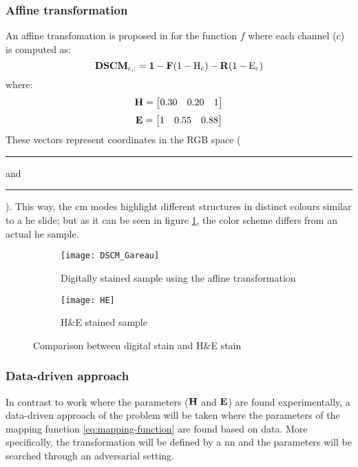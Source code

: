 \documentclass[../main.tex]{subfiles}
\begin{document}
\subsubsection{Affine transformation}
\label{sec:affine-transformation}
An affine transfomation is proposed in \cite{Gareau2009} for the function $f$
where each channel ($c$) is computed as:
\begin{equation} \label{eq:affine-transformation}
	\mathbf{DSCM}_{c,:} = \mathbf{1}
	- \mathbf{F} (1 - \text{H}_c) - \mathbf{R} (1 - \text{E}_c)
\end{equation}
where:
$$ \mathbf{H} = \begin{bmatrix} 0.30 & 0.20 & 1 \end{bmatrix} $$
$$ \mathbf{E} = \begin{bmatrix} 1 & 0.55 & 0.88 \end{bmatrix} $$
These vectors represent coordinates in the RGB space (
\textcolor{Hcolor}{\rule{0.7\baselineskip}{0.7\baselineskip}} and
\textcolor{Ecolor}{\rule{0.7\baselineskip}{0.7\baselineskip}}).
This way, the \gls{cm} modes highlight different structures in distinct
colours similar to a \gls{he} slide; but as it can be seen in figure \ref{fig:affine-example},
the color scheme differs from an actual \gls{he} sample.

\begin{figure}[h]
\centering
\begin{subfigure}{.5\textwidth}
  \centering
  \texttt{[image: DSCM\_Gareau]}
  \caption{Digitally stained sample using the affine transformation}
\end{subfigure}%
\begin{subfigure}{.5\textwidth}
  \centering
  \texttt{[image: HE]}
  \caption{H\&E stained sample}
\end{subfigure}
\caption{Comparison between digital stain and H\&E stain}
\label{fig:affine-example}
\end{figure}

\subsubsection{Data-driven approach}
In contrast to \cite{Gareau2009} work where the parameters
($\mathbf{H}$ and $\mathbf{E}$) are found experimentally, a data-driven approach
of the problem will be taken where the parameters of the mapping function
\ref{eq:mapping-function} are found based on data.
More specifically, the transformation will be defined by a \gls{nn} and the parameters
will be searched through an adversarial setting.
\end{document}
